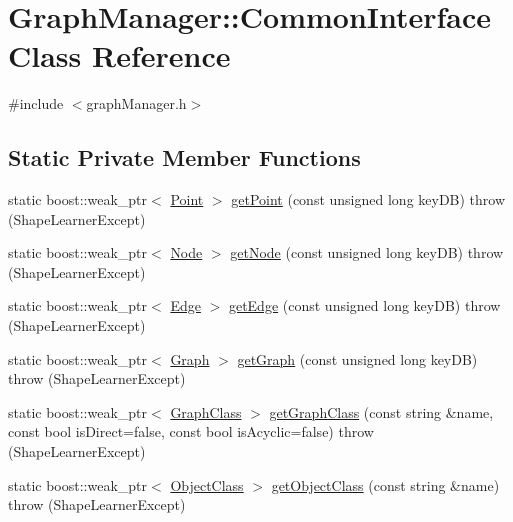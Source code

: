 \hypertarget{class_graph_manager_1_1_common_interface}{}\section{Graph\+Manager\+:\+:Common\+Interface Class Reference}
\label{class_graph_manager_1_1_common_interface}


{\ttfamily \#include $<$graph\+Manager.\+h$>$}

\subsection*{Static Private Member Functions}
\begin{DoxyCompactItemize}
\item 
static boost\+::weak\+\_\+ptr$<$ \hyperlink{class_point}{Point} $>$ \hyperlink{class_graph_manager_1_1_common_interface_a743581e0bca4d960269e1459fbd6ee55}{get\+Point} (const unsigned long key\+D\+B)  throw (\+Shape\+Learner\+Except)
\item 
static boost\+::weak\+\_\+ptr$<$ \hyperlink{class_node}{Node} $>$ \hyperlink{class_graph_manager_1_1_common_interface_a5b3ebe7bc916ccb73ae3f6167d6cc469}{get\+Node} (const unsigned long key\+D\+B)  throw (\+Shape\+Learner\+Except)
\item 
static boost\+::weak\+\_\+ptr$<$ \hyperlink{class_edge}{Edge} $>$ \hyperlink{class_graph_manager_1_1_common_interface_a2507975cd42bfa39543bb831cde9baf1}{get\+Edge} (const unsigned long key\+D\+B)  throw (\+Shape\+Learner\+Except)
\item 
static boost\+::weak\+\_\+ptr$<$ \hyperlink{class_graph}{Graph} $>$ \hyperlink{class_graph_manager_1_1_common_interface_a78c056928df1b0ae99818d132c9e320f}{get\+Graph} (const unsigned long key\+D\+B)  throw (\+Shape\+Learner\+Except)
\item 
static boost\+::weak\+\_\+ptr$<$ \hyperlink{class_graph_class}{Graph\+Class} $>$ \hyperlink{class_graph_manager_1_1_common_interface_a418ecdf2b2c435a06f2aea0d1b820f7e}{get\+Graph\+Class} (const string \&name, const bool is\+Direct=false, const bool is\+Acyclic=false)  throw (\+Shape\+Learner\+Except)
\item 
static boost\+::weak\+\_\+ptr$<$ \hyperlink{class_object_class}{Object\+Class} $>$ \hyperlink{class_graph_manager_1_1_common_interface_a8d55e19e41b474596676c964dc8c66de}{get\+Object\+Class} (const string \&name)  throw (\+Shape\+Learner\+Except)
\item 

\end{DoxyCompactItemize}
